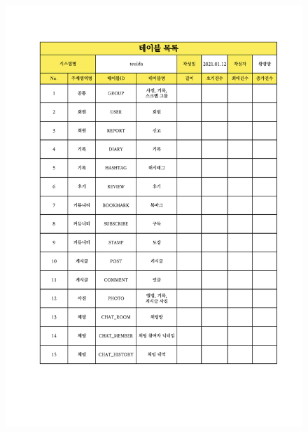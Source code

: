 \begin{figure}[h]
    \begin{center}
        \includegraphics[width=\textwidth]{./Figure/Design/Display/table/tableList.pdf} \\
    \end{center}
\end{figure}
\newpage

